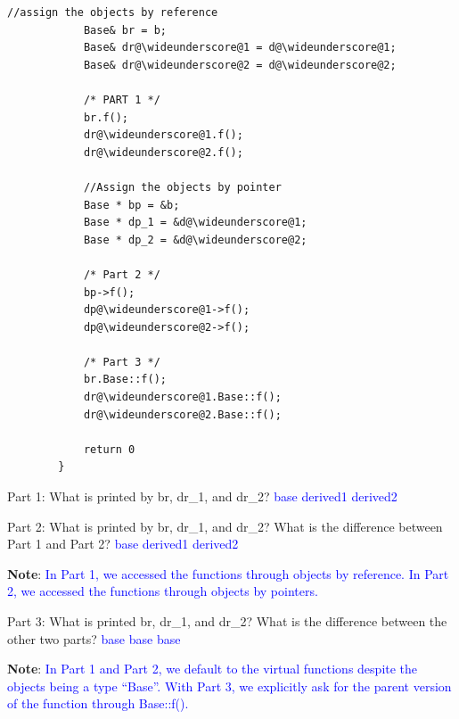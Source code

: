 \documentclass{article}
\newcommand{\wideunderscore}{\underline{\hphantom{n}}}
\begin{document}
\begin{enumerate}[label=(\alph*)]
\begin{lstlisting}[style = CStyle]
            //assign the objects by reference
            Base& br = b;
            Base& dr@\wideunderscore@1 = d@\wideunderscore@1;
            Base& dr@\wideunderscore@2 = d@\wideunderscore@2;

            /* PART 1 */
            br.f();
            dr@\wideunderscore@1.f();
            dr@\wideunderscore@2.f();

            //Assign the objects by pointer
            Base * bp = &b;
            Base * dp_1 = &d@\wideunderscore@1;
            Base * dp_2 = &d@\wideunderscore@2;

            /* Part 2 */
            bp->f();
            dp@\wideunderscore@1->f();
            dp@\wideunderscore@2->f();

            /* Part 3 */
            br.Base::f();
            dr@\wideunderscore@1.Base::f();
            dr@\wideunderscore@2.Base::f();

            return 0
        }
    \end{lstlisting}
    Part 1:
    What is printed by br, dr\_1, and dr\_2?
    \newline\textcolor{blue}{base}
    \newline\textcolor{blue}{derived\@\wideunderscore\@1}
    \newline\textcolor{blue}{derived\@\wideunderscore\@2}
    
    \vspace{2cm}
    Part 2:
    What is printed by br, dr\_1, and dr\_2? What is the difference between Part 1 and Part 2?
    \newline\textcolor{blue}{base}
    \newline\textcolor{blue}{derived\@\wideunderscore\@1}
    \newline\textcolor{blue}{derived\@\wideunderscore\@2}
    
    \vspace{1cm}
    
\textbf{Note}: \textcolor{blue}{In Part 1, we accessed the functions through objects by reference. In Part 2, we accessed the functions through objects by pointers.}

    \vspace{2cm}
    Part 3:
    What is printed br, dr\_1, and dr\_2? What is the difference between the other two parts?
    \newline\textcolor{blue}{base}
    \newline\textcolor{blue}{base}
    \newline\textcolor{blue}{base}
    \vspace{2cm}
    \end{enumerate}

\textbf{Note}: \textcolor{blue}{In Part 1 and Part 2, we default to the virtual functions despite the objects being a type “Base”. With Part 3, we explicitly ask for the parent version of the function through Base::f().}




    
\end{document}
